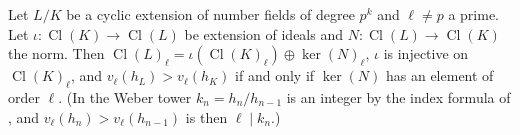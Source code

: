 Let $L/K$ be a cyclic extension of number fields of degree $p^k$ and $\ell\ne p$ a prime. Let $\iota:\operatorname{Cl}(K)\to\operatorname{Cl}(L)$ be extension of ideals and $N:\operatorname{Cl}(L)\to\operatorname{Cl}(K)$ the norm. Then $\operatorname{Cl}(L)_\ell=\iota(\operatorname{Cl}(K)_\ell)\oplus\ker(N)_\ell$, $\iota$ is injective on $\operatorname{Cl}(K)_\ell$, and $v_\ell(h_L)>v_\ell(h_K)$ if and only if $\ker(N)$ has an element of order $\ell$. (In the Weber tower $k_n=h_n/h_{n-1}$ is an integer by the index formula of \cite{KY}, and $v_\ell(h_n)>v_\ell(h_{n-1})$ is then $\ell\mid k_n$.)
